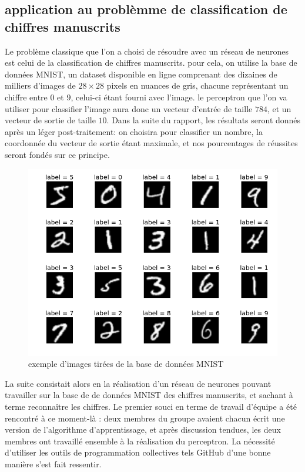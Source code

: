 \documentclass[
    10pt,
    a4paper,
    oneside,
    headinclude,footinclude,
    BCOR=5mm,
    captions=tableabove
]{scrartcl}
\begin{document}
\subsection{application au problèmme de classification de chiffres manuscrits}

Le problème classique que l'on a choisi de résoudre avec un réseau de neurones est celui de la classification de chiffres manuscrits. pour cela, on utilise la base de données MNIST, un dataset disponible en ligne comprenant des dizaines de milliers d'images de $28\times 28$ pixels en nuances de gris, chacune représentant un chiffre entre $0$ et $9$, celui-ci étant fourni avec l'image. le perceptron que l'on va utiliser pour classifier l'image aura donc un vecteur d'entrée de taille $784$, et un vecteur de sortie de taille $10$. Dans la suite du rapport, les résultats seront donnés après un léger post-traitement: on choisira pour classifier un nombre, la coordonnée du vecteur de sortie étant maximale, et nos pourcentages de réussites seront fondés sur ce principe.

\begin{figure}[h!]
\includegraphics[width=0.8 \linewidth]{MNIST.png}
\centering
 \caption{exemple d'images tirées de la base de données MNIST}
 \label{fig:MNIST}
\end{figure}

La suite consistait alors en la réalisation d'un réseau de neurones pouvant travailler sur la base de de données MNIST des chiffres manuscrits, et sachant à terme reconnaître les chiffres. Le premier souci en terme de travail d'équipe a été rencontré à ce moment-là : deux membres du groupe avaient chacun écrit une version de l'algorithme d'apprentissage, et après discussion tendues, les deux membres ont travaillé ensemble à la réalisation du perceptron. La nécessité d'utiliser les outils de programmation collectives tels GitHub d'une bonne manière s'est fait ressentir.
\vspace{5mm}
\end{document}
